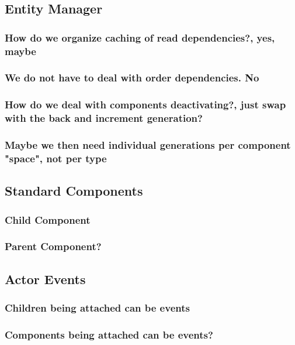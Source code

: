
\subsection{Entity Manager}

    \subsubsection{How do we organize caching of read dependencies?, yes, maybe}
    \subsubsection{We do not have to deal with order dependencies. No}
    \subsubsection{How do we deal with components deactivating?, just swap with the back and increment generation?}
        \subsubsection{Maybe we then need individual generations per component "space", not per type}

\subsection{Standard Components}
    \subsubsection{Child Component}
    \subsubsection{Parent Component?}

\subsection{Actor Events}
    \subsubsection{Children being attached can be events}
    \subsubsection{Components being attached can be events?}

